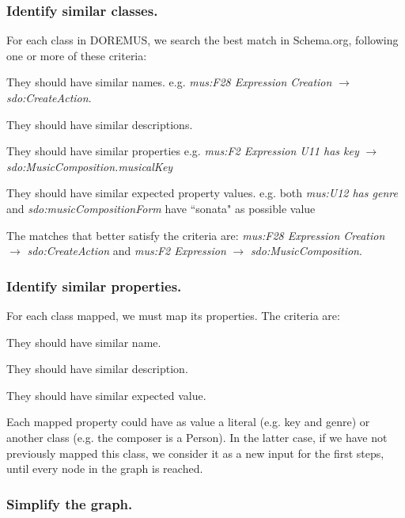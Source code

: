 \documentclass{llncs}
\begin{document}
\subsubsection{Identify similar classes.}
\label{sec:classmap}
For each class in DOREMUS, we search the best match in Schema.org, following one or more of these criteria:
\begin{enumerate*}
 \item{
They should have similar names.
e.g. \textit{mus:F28 Expression Creation} $\rightarrow$ \textit{sdo:CreateAction}.
}
 \item{They should have similar descriptions.}
 \item{They should have similar properties
e.g. \textit{mus:F2 Expression U11 has key} $\rightarrow$ \textit{sdo:MusicComposition.musicalKey}
}
 \item{They should have similar expected property values.
e.g. both \textit{mus:U12 has genre} and \textit{sdo:musicCompositionForm} have ``sonata" as possible value
}
\end{enumerate*}

The matches that better satisfy the criteria are: \textit{mus:F28 Expression Creation} $\rightarrow$  \textit{sdo:CreateAction} and \textit{mus:F2 Expression} $\rightarrow$  \textit{sdo:MusicComposition}.

\subsubsection{Identify similar properties.}
For each class mapped, we must map its properties. The criteria are:
\begin{enumerate*}
 \item{They should have similar name.}
 \item{They should have similar description.}
 \item{They should have similar expected value.}
\end{enumerate*}

Each mapped property could have as value a literal (e.g. key and genre) or another class  (e.g. the composer is a Person). In the latter case, if we have not previously mapped this class, we consider it as a new input for the first steps, until every node in the graph is reached.

\subsubsection{Simplify the graph.}
\end{document}
